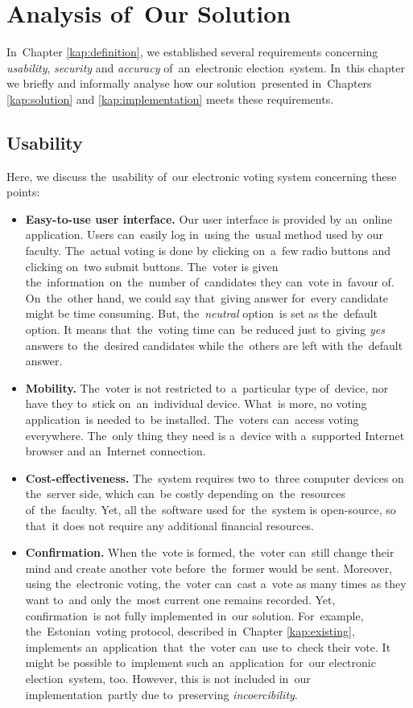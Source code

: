 \chapter{Analysis of~Our Solution}
\label{kap:analysis}

In~Chapter \ref{kap:definition}, we established several requirements concerning \emph{usability}, \emph{security} and \emph{accuracy} of~an~electronic election~system. In~this chapter we briefly and informally analyse how our solution~presented in~Chapters \ref{kap:solution} and \ref{kap:implementation} meets these requirements.

\section{Usability}
Here, we discuss the~usability of~our electronic voting system concerning these points:
\begin{itemize}
\item \textbf{Easy-to-use user interface.} Our user interface is provided by an~online application. Users can~easily log in~using the~usual method used by our faculty. The~actual voting is done by clicking on~a~few radio buttons and clicking on~two submit buttons. The~voter is given the~information~on~the~number of~candidates they can~vote in~favour of. On~the~other hand, we could say that~giving answer for~every candidate might be time consuming. But, the~\emph{neutral} option~is set as the~default option. It means that~the~voting time can~be reduced just to~giving \emph{yes} answers to~the~desired candidates while the~others are left with the~default answer.
\item \textbf{Mobility.} The~voter is not restricted to~a~particular type of~device, nor have they to~stick on~an~individual device. What~is more, no voting application~is needed to~be installed. The~voters can~access voting everywhere. The~only thing they need is a~device with a~supported Internet browser and an~Internet connection.
\item \textbf{Cost-effectiveness.} The~system requires two to~three computer devices on the~server side, which can~be costly depending on~the~resources of~the~faculty. Yet, all the~software used for~the~system is open-source, so that~it does not require any additional financial resources.
\item \textbf{Confirmation.} When the~vote is formed, the~voter can~still change their mind and create another vote before~the~former would be sent. Moreover, using the~electronic voting, the~voter can~cast a~vote as many times as they want to~and only the~most current one remains recorded. Yet, confirmation~is not fully implemented in~our solution. For~example, the~Estonian~voting protocol, described in~Chapter \ref{kap:existing}, implements an~application~that~the~voter can~use to~check their vote. It might be possible to~implement such an~application~for~our electronic election~system, too. However, this is not included in~our implementation~partly due to~preserving \emph{incoercibility}.
\end{itemize}
